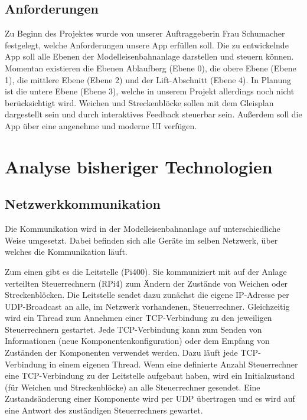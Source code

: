 \documentclass{article}
\begin{document}
\subsection{Anforderungen}
Zu Beginn des Projektes wurde von unserer Auftraggeberin Frau Schumacher festgelegt, welche Anforderungen unsere App erfüllen soll.
Die zu entwickelnde App soll alle Ebenen der Modelleisenbahnanlage darstellen und steuern können.
Momentan existieren die Ebenen Ablaufberg (Ebene 0), die obere Ebene (Ebene 1), die mittlere Ebene (Ebene 2) und der Lift-Abschnitt (Ebene 4).
In Planung ist die untere Ebene (Ebene 3), welche in unserem Projekt allerdings noch nicht berücksichtigt wird.
Weichen und Streckenblöcke sollen mit dem Gleisplan dargestellt sein und durch interaktives Feedback steuerbar sein.
Außerdem soll die App über eine angenehme und moderne UI verfügen.

\section{Analyse bisheriger Technologien}
\subsection{Netzwerkkommunikation}
Die Kommunikation wird in der Modelleisenbahnanlage auf unterschiedliche Weise umgesetzt.
Dabei befinden sich alle Geräte im selben Netzwerk, über welches die Kommunikation läuft.

Zum einen gibt es die Leitstelle (Pi400).
Sie kommuniziert mit auf der Anlage verteilten Steuerrechnern (RPi4) zum Ändern der Zustände von Weichen oder Streckenblöcken.
Die Leitstelle sendet dazu zunächst die eigene IP-Adresse per UDP-Broadcast an alle, im Netzwerk vorhandenen, Steuerrechner.
Gleichzeitig wird ein Thread zum Annehmen einer TCP-Verbindung zu den jeweiligen Steuerrechnern gestartet.
Jede TCP-Verbindung kann zum Senden von Informationen (neue Komponentenkonfiguration) oder dem Empfang von Zuständen der Komponenten verwendet werden.
Dazu läuft jede TCP-Verbindung in einem eigenen Thread. Wenn eine definierte Anzahl Steuerrechner eine TCP-Verbindung zu der Leitstelle aufgebaut haben, wird ein Initialzustand (für Weichen und Streckenblöcke) an alle Steuerrechner gesendet.
Eine Zustandsänderung einer Komponente wird per UDP übertragen und es wird auf eine Antwort des zuständigen Steuerrechners gewartet.
\end{document}
